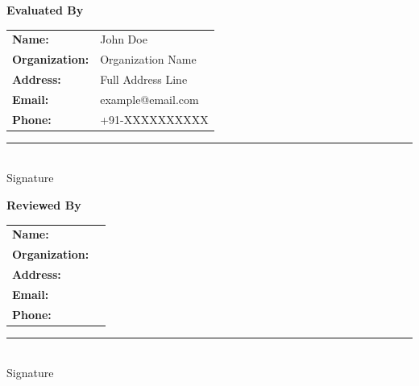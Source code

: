 \documentclass[12pt]{article}
\begin{document}
\begin{titlepage}
\vfill

\noindent
\begin{minipage}[t]{0.48\textwidth}
\textbf{\large Evaluated By}

\vspace{0.3cm}

\renewcommand{\arraystretch}{1.3}
\begin{tabular}{p{2.7cm} p{5.5cm}}
\textbf{Name:} & John Doe \\
\textbf{Organization:} & Organization Name \\
\textbf{Address:} & Full Address Line \\
\textbf{Email:} & example@email.com \\
\textbf{Phone:} & +91-XXXXXXXXXX \\
\end{tabular}

\vspace{1.5cm}

{\centering
\rule{0.7\textwidth}{0.4pt} \\[-0.1cm]
\small Signature
\par}

\end{minipage}
\hfill
\begin{minipage}[t]{0.48\textwidth}
\textbf{\large Reviewed By}

\vspace{0.3cm}

\renewcommand{\arraystretch}{1.3}
\begin{tabular}{p{3cm} p{5.5cm}}
\textbf{Name:} & \\
\textbf{Organization:} & \\
\textbf{Address:} & \\
\textbf{Email:} & \\
\textbf{Phone:} & \\
\end{tabular}

\vspace{1.5cm}

{\centering
\rule{0.7\textwidth}{0.4pt} \\[-0.1cm]
\small Signature
\par}

\end{minipage}


\end{titlepage}
\end{document}
